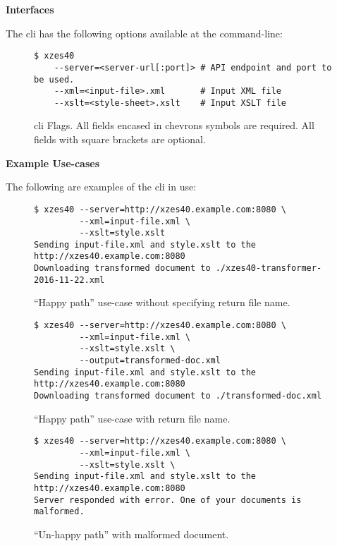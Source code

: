 \textbf{Interfaces}

The \gls{cli} has the following options available at the command-line:
\begin{figure}
    \begin{lstlisting}
$ xzes40
    --server=<server-url[:port]> # API endpoint and port to be used.
    --xml=<input-file>.xml       # Input XML file
    --xslt=<style-sheet>.xslt    # Input XSLT file
    \end{lstlisting}
    \caption{\gls{cli} Flags. All fields encased in chevrons symbols are required. All fields with square brackets are optional.}
\end{figure}

\textbf{Example Use-cases}

The following are examples of the \gls{cli} in use:

\begin{figure}
    \begin{lstlisting}
$ xzes40 --server=http://xzes40.example.com:8080 \
         --xml=input-file.xml \
         --xslt=style.xslt
Sending input-file.xml and style.xslt to the http://xzes40.example.com:8080
Downloading transformed document to ./xzes40-transformer-2016-11-22.xml
    \end{lstlisting}
    \caption{``Happy path'' use-case without specifying return file name.}
\end{figure}


\begin{figure}
    \begin{lstlisting}
$ xzes40 --server=http://xzes40.example.com:8080 \
         --xml=input-file.xml \
         --xslt=style.xslt \
         --output=transformed-doc.xml
Sending input-file.xml and style.xslt to the http://xzes40.example.com:8080
Downloading transformed document to ./transformed-doc.xml
    \end{lstlisting}
   \caption{``Happy path'' use-case with return file name.}
\end{figure}

\begin{figure}
    \begin{lstlisting}
$ xzes40 --server=http://xzes40.example.com:8080 \
         --xml=input-file.xml \
         --xslt=style.xslt \
Sending input-file.xml and style.xslt to the http://xzes40.example.com:8080
Server responded with error. One of your documents is malformed.
    \end{lstlisting}
    \caption{``Un-happy path'' with malformed document.}
\end{figure}


